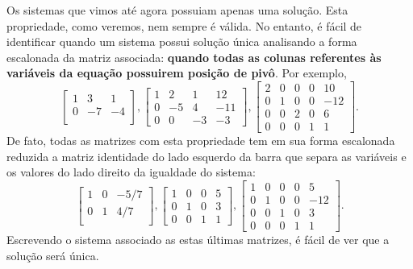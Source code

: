 \documentclass[../livro.tex]{subfiles} %
\begin{document}
Os sistemas que vimos até agora possuiam apenas uma solução. Esta propriedade, como veremos, nem sempre é válida. No entanto, é fácil de identificar quando um sistema possui solução única analisando a forma escalonada da matriz associada: \textbf{quando todas as colunas referentes às variáveis da equação possuirem posição de pivô}. Por exemplo,
\begin{equation}
\left[
 \begin{array}{cc|c}
  1 & 3 & 1 \\
  0 & -7 & -4 \\
 \end{array}
\right],
\left[
  \begin{array}{ccc|c}
    1 &  2 &  1 &  12 \\
    0 & -5 &  4 & -11 \\
    0 &  0 & -3 & -3
  \end{array}
\right],
 \left[
  \begin{array}{cccc|c}
    2 &  0 &  0 & 0 & 10 \\
    0 &  1 &  0 & 0 & -12 \\
    0 &  0 &  2 & 0 & 6 \\
    0 &  0 &  0 & 1 & 1
  \end{array}
\right].
\end{equation} De fato, todas as matrizes com esta propriedade tem em sua forma escalonada reduzida a matriz identidade do lado esquerdo da barra que separa as variáveis e os valores do lado direito da igualdade do sistema:
\begin{equation}
\left[
 \begin{array}{cc|c}
  1 & 0 & -5/7 \\
  0 & 1 &  4/7 \\
 \end{array}
\right],
\left[
  \begin{array}{ccc|c}
    1 &  0 &  0   &  5 \\
    0 &  1 &  0   &  3 \\
    0 &  0 &  1   &  1
  \end{array}
\right],
 \left[
  \begin{array}{cccc|c}
    1 &  0 &  0 & 0 & 5 \\
    0 &  1 &  0 & 0 & -12 \\
    0 &  0 &  1 & 0 & 3 \\
    0 &  0 &  0 & 1 & 1
  \end{array}
\right].
\end{equation} Escrevendo o sistema associado as estas últimas matrizes, é fácil de ver que a solução será única.
\end{document}
